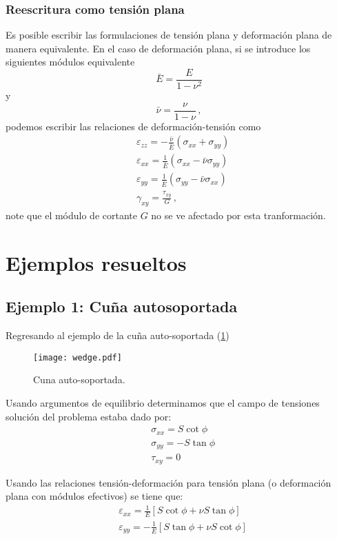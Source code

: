 \documentclass[../notas medios.tex]{subfiles}
\begin{document}
\subsubsection{Reescritura como tensión plana}
Es posible escribir las formulaciones de tensión plana y deformación plana de manera equivalente. En el caso de deformación plana, si se introduce los siguientes módulos equivalente
\[\bar E = \frac{E}{1 - \nu^2}\]
y
\[\bar \nu  = \frac{\nu }{1 - \nu}\, ,\]
podemos escribir las relaciones de deformación-tensión como
\begin{align*}
& \varepsilon_{zz} =  - \frac{\bar\nu}{\bar E}(\sigma_{xx} + \sigma_{yy}) \\
& \varepsilon_{xx} =    \frac{1}{\bar E}(\sigma_{xx} - \bar\nu \sigma_{yy})\\
& \varepsilon_{yy} = \frac{1}{\bar E}(\sigma_{yy} - \bar\nu \sigma_{xx})\\
& \gamma_{xy} = \frac{\tau_{xy}}{G}\, ,
\end{align*}
note que el módulo de cortante \(G\) no se ve afectado por esta tranformación.

\section{Ejemplos resueltos}
\subsection*{Ejemplo 1: Cuña autosoportada}

Regresando al ejemplo de la cuña auto-soportada (\cref{wedgee})
\begin{figure}[H]
\centering
	\texttt{[image: wedge.pdf]}
	\caption{Cuna auto-soportada.}
	\label{wedgee}
\end{figure}


Usando argumentos de equilibrio determinamos que el campo de tensiones solución del problema estaba dado por:
\begin{equation} \label{tencuna}
\begin{split}
& \sigma_{xx} = S \cot\phi \\
& \sigma_{yy} =  - S \tan\phi \\
& \tau_{xy} = 0
\end{split}
\end{equation}

Usando las relaciones tensión-deformación para tensión plana (o deformación plana con módulos efectivos) se tiene que:
\begin{align*}
&\varepsilon_{xx} = \frac{1}{E}[S \cot\phi  + \nu S \tan\phi]\\
&\varepsilon_{yy} =  - \frac{1}{E}[S \tan\phi  + \nu S \cot\phi]
\end{align*}
\end{document}

